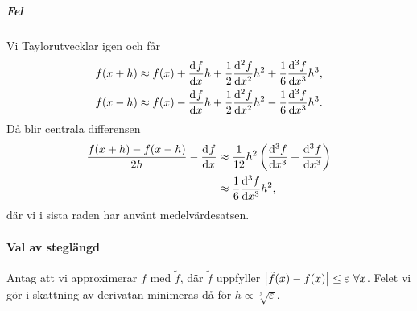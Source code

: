 \subparagraph{Fel}
Vi Taylorutvecklar igen och får
\begin{align*}
	f(x + h) &\approx f(x) + \dv[]{f}{x} (x)h + \frac{1}{2}\dv[2]{f}{x} (x)h^{2} + \frac{1}{6}\dv[3]{f}{x} (c_{1})h^{3}, \\
	f(x - h) &\approx f(x) - \dv[]{f}{x} (x)h + \frac{1}{2}\dv[2]{f}{x} (x)h^{2} - \frac{1}{6}\dv[3]{f}{x} (c_{2})h^{3}.
\end{align*}
Då blir centrala differensen
\begin{align*}
	\frac{f(x + h) - f(x - h)}{2h} - \dv[]{f}{x} (x) &\approx \frac{1}{12}h^{2}\left(\dv[3]{f}{x} (c_{1}) + \dv[3]{f}{x} (c_{2})\right) \\
	                                                 &\approx \frac{1}{6}\dv[3]{f}{x} (c)h^{2},
\end{align*}
där vi i sista raden har använt medelvärdesatsen.

\paragraph{Val av steglängd}
Antag att vi approximerar $f$ med $\tilde{f}$, där $\tilde{f}$ uppfyller $\abs{\tilde{f}(x) - f(x)} \leq \varepsilon\ \forall x$. Felet vi gör i skattning av derivatan minimeras då för $h\propto\sqrt[3]{\varepsilon}$.